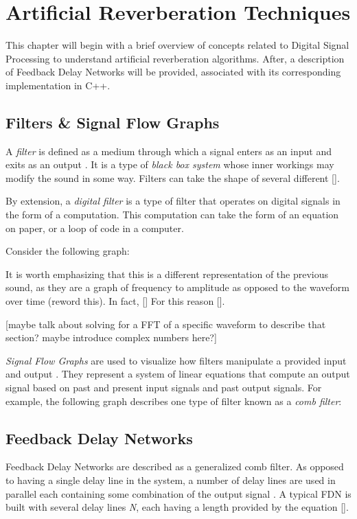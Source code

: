\chapter{Artificial Reverberation Techniques}
\hspace*{-0.15cm}This chapter will begin with a brief overview of concepts related to Digital Signal Processing to understand artificial reverberation algorithms. After, a description of Feedback Delay Networks will be provided, associated with its corresponding implementation in C++.

\section{Filters \& Signal Flow Graphs}
A \textit{filter} is defined as a medium through which a signal enters as an input and exits as an output \cite{FILTERS07}. It is a type of \textit{black box system} whose inner workings may modify the sound in some way. Filters can take the shape of several different [].

By extension, a \textit{digital filter} is a type of filter that operates on digital signals in the form of a computation. This computation can take the form of an equation on paper, or a loop of code in a computer.

Consider the following graph:

It is worth emphasizing that this is a different representation of the previous sound, as they are a graph of frequency to amplitude as opposed to the waveform over time (reword this). In fact, [] For this reason [].

[maybe talk about solving for a FFT of a specific waveform to describe that section? maybe introduce complex numbers here?]

\textit{Signal Flow Graphs} are used to visualize how filters manipulate a provided input and output \cite{FILTERS07}. They represent a system of linear equations that compute an output signal based on past and present input signals and past output signals. For example, the following graph describes one type of filter known as a \textit{comb filter}:

\section{Feedback Delay Networks}
Feedback Delay Networks are described as a generalized comb filter. As opposed to having a single delay line in the system, a number of delay lines are used in parallel each containing some combination of the output signal \cite{PUCKE}. A typical FDN is built with several delay lines \textit{N}, each having a length provided by the equation [].

